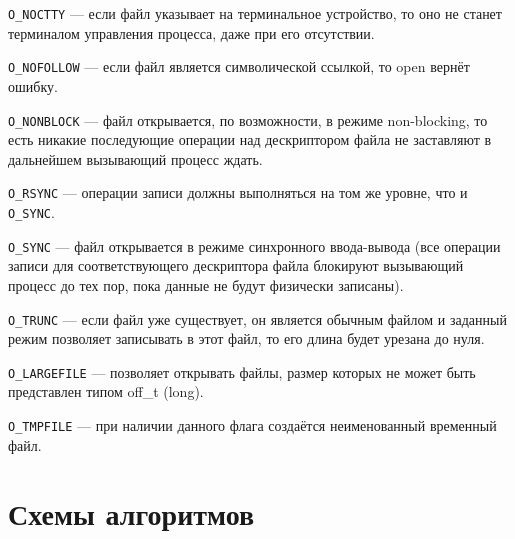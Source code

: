 \texttt{O\_NOCTTY} --- если файл указывает на терминальное устройство, то оно не станет терминалом управления процесса, даже при его отсутствии.

\texttt{O\_NOFOLLOW} --- если файл является символической ссылкой, то open вернёт ошибку.

\texttt{O\_NONBLOCK} --- файл открывается, по возможности, в режиме non-blocking, то есть никакие последующие операции над дескриптором файла не заставляют в дальнейшем вызывающий процесс ждать.

\texttt{O\_RSYNC} --- операции записи должны выполняться на том же уровне, что и \texttt{O\_SYNC}.

\texttt{O\_SYNC} --- файл открывается в режиме синхронного ввода-вывода (все операции записи для соответствующего дескриптора файла блокируют вызывающий процесс до тех пор, пока данные не будут физически записаны).

\texttt{O\_TRUNC} --- если файл уже существует, он является обычным файлом и заданный режим позволяет записывать в этот файл, то его длина будет урезана до нуля.

\texttt{O\_LARGEFILE} --- позволяет открывать файлы, размер которых не может быть представлен типом off\_t (long).

\texttt{O\_TMPFILE} --- при наличии данного флага создаётся неименованный временный файл.

\chapter{Схемы алгоритмов}









